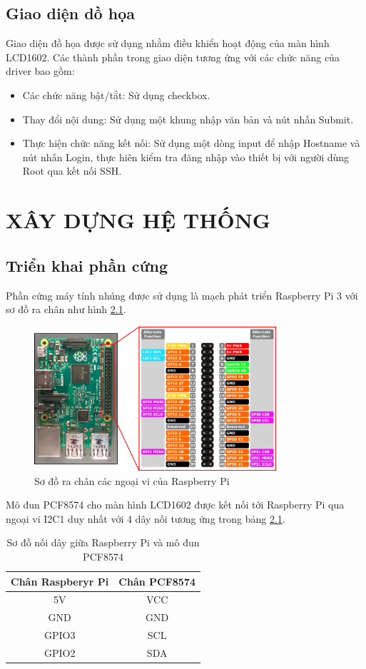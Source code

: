 \documentclass{report}
\begin{document}
\section{Giao diện dồ họa}
Giao diện đồ họa được sử dụng nhằm điều khiển hoạt động của màn hình LCD1602. Các thành phần trong giao diện tương ứng với các chức năng của driver bao gồm:
\begin{itemize}
	\item Các chức năng bật/tắt: Sử dụng checkbox.
	\item Thay đổi nội dung: Sử dụng một khung nhập văn bản và nút nhấn Submit.
	\item Thực hiện chức năng kết nối: Sử dụng một dòng input để nhập Hostname và nút nhấn Login, thực hiên kiểm tra đăng nhập vào thiết bị với người dùng Root qua kết nối SSH.
\end{itemize}
\chapter{XÂY DỰNG HỆ THỐNG}
\section{Triển khai phần cứng}
Phần cứng máy tính nhúng được sử dụng là mạch phát triển Raspberry Pi 3 với sơ đồ ra chân như hình \ref{rpi3-pinout}. 
\begin{figure}[H]
	\centering
	\includegraphics[width=0.8\textwidth]{../images/rp3_pinout.png}
	\caption{Sơ đồ ra chân các ngoại vi của Raspberry Pi}
	\label{rpi3-pinout}
\end{figure}

Mô đun PCF8574 cho màn hình LCD1602 được kết nối tới Raspberry Pi qua ngoại vi I2C1 duy nhất với 4 dây nối tương ứng trong bảng \ref{wiring}.

\begin{table}[H]
	\centering
	\caption{Sơ đồ nối dây giữa Raspberry Pi và mô đun PCF8574}
	\begin{tabular}{|c|c|}
		\hline
		\textbf{Chân Raspberyr Pi} & \textbf{Chân PCF8574}\\
		\hline
		5V & VCC\\
		GND & GND\\
		GPIO3 & SCL\\
		GPIO2 & SDA\\
		\hline
	\end{tabular}
	\label{wiring}
\end{table}
\end{document}
